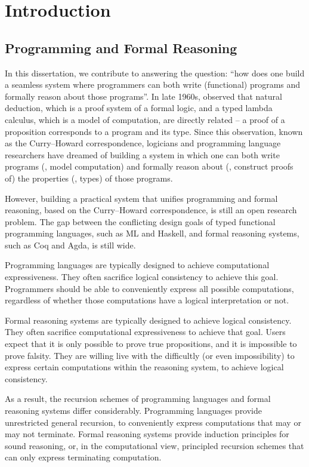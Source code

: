 \chapter{Introduction}\label{ch:intro}

\section{Programming and Formal Reasoning}\label{sec:intro:motiv}
In this dissertation, we contribute to answering the question:
``how does one build a seamless system where programmers can both
write (functional) programs and formally reason about those programs''.
In late 1960s, \citet{Howard69} observed that natural deduction, which is
a proof system of a formal logic, and a typed lambda calculus, which is
a model of computation, are directly related --
a proof of a proposition corresponds to a program and its type.
Since this observation, known as the Curry--Howard correspondence,
logicians and programming language researchers 
have  dreamed of
building a system in which one can both write programs
(\ie, model computation) and formally reason about (\ie, construct proofs of)
the properties (\ie, types) of those programs.

However, building a practical system that unifies programming and
formal reasoning, based on the Curry--Howard correspondence, is still
an open research problem. The gap between the conflicting
design goals of typed functional programming languages, such as ML and Haskell,
and formal reasoning systems, such as Coq and Agda, is still wide.

Programming languages are typically designed to achieve
computational expressiveness. They often sacrifice logical consistency
to achieve this goal. Programmers should be able to
conveniently express all possible computations, regardless of whether those
computations have a logical interpretation or not.

Formal reasoning systems are typically designed to achieve logical consistency.
They often sacrifice computational expressiveness to achieve that goal.
Users expect that it is only possible to prove true propositions,
and it is impossible to prove falsity. They are willing
live with the difficultly (or even impossibility) to
express certain computations within the reasoning system,
to achieve logical consistency.

As a result, the recursion schemes of programming languages and
formal reasoning systems differ considerably.
Programming languages provide unrestricted general recursion,
to conveniently express computations
that may or may not terminate.
Formal reasoning systems provide induction principles for sound reasoning,
or, in the computational view, principled recursion schemes
that can only express terminating computation.

